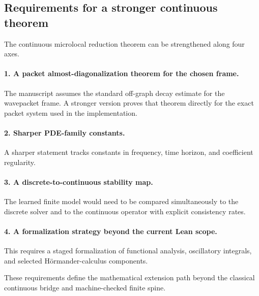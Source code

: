 \subsection{Requirements for a stronger continuous theorem}

The continuous microlocal reduction theorem can be strengthened along four axes.

\paragraph{1. A packet almost-diagonalization theorem for the chosen frame.}
The manuscript assumes the standard off-graph decay estimate for the wavepacket frame. A stronger version proves that theorem directly for the exact packet system used in the implementation.

\paragraph{2. Sharper PDE-family constants.}
A sharper statement tracks constants in frequency, time horizon, and coefficient regularity.

\paragraph{3. A discrete-to-continuous stability map.}
The learned finite model would need to be compared simultaneously to the discrete solver and to the continuous operator with explicit consistency rates.

\paragraph{4. A formalization strategy beyond the current Lean scope.}
This requires a staged formalization of functional analysis, oscillatory integrals, and selected H\"ormander-calculus components.

These requirements define the mathematical extension path beyond the classical continuous bridge and machine-checked finite spine.

